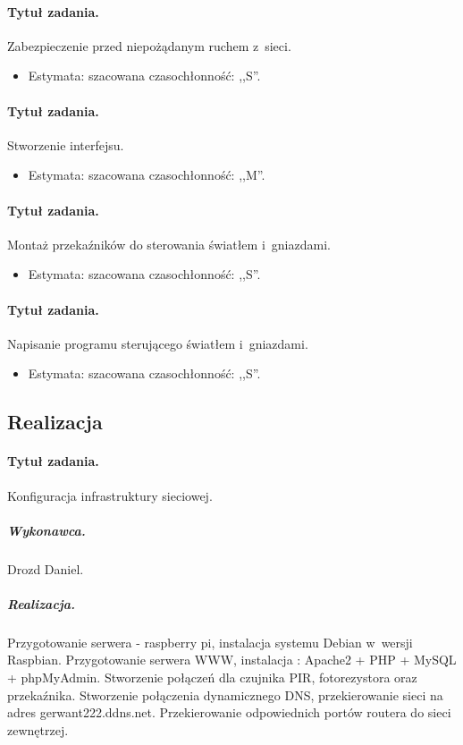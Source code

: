 	\paragraph{Tytuł zadania.} Zabezpieczenie przed niepożądanym ruchem z~sieci.
	\begin{itemize}
		\item Estymata: szacowana czasochłonność: ,,S''.
	\end{itemize}
	
	\paragraph{Tytuł zadania.} Stworzenie interfejsu.
	\begin{itemize}
		\item Estymata: szacowana czasochłonność: ,,M''.
	\end{itemize}
	
	\paragraph{Tytuł zadania.} Montaż przekaźników do sterowania światłem i~gniazdami.
	\begin{itemize}
		\item Estymata: szacowana czasochłonność: ,,S''.
	\end{itemize}
	
	\paragraph{Tytuł zadania.} Napisanie programu sterującego światłem i~gniazdami.
	\begin{itemize}
		\item Estymata: szacowana czasochłonność: ,,S''.
	\end{itemize}


	\subsection{Realizacja}
	
	\paragraph{Tytuł zadania.} Konfiguracja infrastruktury sieciowej.
	\subparagraph{Wykonawca.} Drozd Daniel.
	\subparagraph{Realizacja.} Przygotowanie serwera - raspberry pi, instalacja systemu Debian w~wersji Raspbian. Przygotowanie serwera WWW, instalacja : Apache2 + PHP + MySQL + phpMyAdmin.
  Stworzenie połączeń dla czujnika PIR, fotorezystora oraz przekaźnika. Stworzenie połączenia dynamicznego DNS, przekierowanie sieci na adres gerwant222.ddns.net. Przekierowanie odpowiednich portów routera do sieci zewnętrzej.
 	   	   
